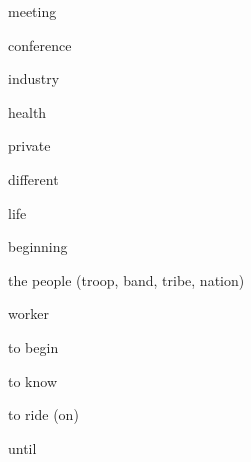 \documentclass[avery5371,grid,frame]{flashcards}
\begin{document}
\begin{flashcard}{\LARGE meeting}
\LARGE {}
\end{flashcard}
\begin{flashcard}{\LARGE conference}
\LARGE {}
\end{flashcard}
\begin{flashcard}{\LARGE industry}
\LARGE {}
\end{flashcard}
\begin{flashcard}{\LARGE health}
\LARGE {}
\end{flashcard}
\begin{flashcard}{\LARGE private}
\LARGE {}
\end{flashcard}
\begin{flashcard}{\LARGE different}
\LARGE {}
\end{flashcard}
\begin{flashcard}{\LARGE life}
\LARGE {}
\end{flashcard}
\begin{flashcard}{\LARGE beginning}
\LARGE {}
\end{flashcard}
\begin{flashcard}{\LARGE the people (troop, band, tribe, nation)}
\LARGE {}
\end{flashcard}
\begin{flashcard}{\LARGE worker}
\LARGE {}
\end{flashcard}
\begin{flashcard}{\LARGE to begin}
\LARGE {}
\end{flashcard}
\begin{flashcard}{\LARGE to know}
\LARGE {}
\end{flashcard}
\begin{flashcard}{\LARGE to ride (on)}
\LARGE {}
\end{flashcard}
\begin{flashcard}{\LARGE until}
\LARGE {}
\end{flashcard}
\end{document}
